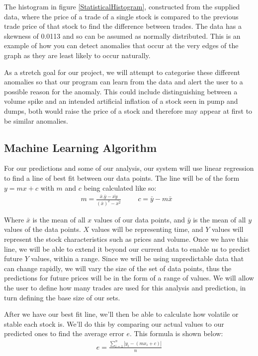 \documentclass[11pt, oneside, a4paper]{article}
\begin{document}
The histogram in figure \ref{StatisticalHistogram}, constructed from the supplied
data, where the price of a trade of a single stock is compared to the previous
trade price of that stock to find the difference between trades. The data has a
skewness of 0.0113 and so can be assumed as normally distributed. This is an
example of how you can detect anomalies that occur at the very edges of the graph
as they are least likely to occur naturally.

As a stretch goal for our project, we will attempt to categorise these different
anomalies so that our program can learn from the data and alert the user to a possible
reason for the anomaly. This could include distinguishing between a volume spike and
an intended artificial inflation of a stock seen in pump and dumps, both would raise
the price of a stock and therefore may appear at first to be similar anomalies.

\subsection{Machine Learning Algorithm}

For our predictions and some of our analysis, our system will use linear regression
to find a line of best fit between our data points. The line will be of the form
$y=mx+c$ with $m$ and $c$ being calculated like so:
\begin{align*}
		& m=\frac{\bar{x}.\bar{y} - \bar{xy}}{(\bar{x})^2 - \bar{x^2}}&
		&&
		c=\bar{y} - m \bar{x}
		&&
\end{align*}

Where $\bar{x}$ is the mean of all $x$ values of our data points, and $\bar{y}$ is the
mean of all $y$ values of the data points. $X$ values will be representing time, and
$Y$ values will represent the stock characteristics such as prices and volume. Once
we have this line, we will be able to extend it beyond our current data to enable
us to predict future $Y$ values, within a range. Since we will be using unpredictable
data that can change rapidly, we will vary the size of the set of data points, thus
the predictions for future prices will be in the form of a range of values. We will
allow the user to define how many trades are used for this analysis and prediction,
in turn defining the base size of our sets.

After we have our best fit line, we’ll then be able to calculate how volatile or
stable each stock is. We’ll do this by comparing our actual values to our predicted
ones to find the average error $e$. This formula is shown below:
\begin{align*}
	&e=\frac{\sum_{i=1}^{n}|y_i - (mx_i + c)|}{n}&
\end{align*}
\end{document}
